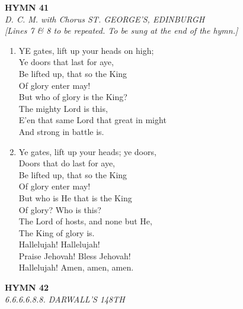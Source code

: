 \newpage
\begin{center}
    {\Large \textbf{HYMN 41}}
    \\
    \textit{D. C. M. with Chorus ST. GEORGE'S, EDINBURGH}
    \\
    \textit{\small [Lines 7 & 8 to be repeated. To be sung at the end of the hymn.]}
\end{center}
\vspace{1em}

\begin{enumerate}
    \item YE gates, lift up your heads on high; \\
        Ye doors that last for aye, \\
        Be lifted up, that so the King \\
        Of glory enter may! \\
        But who of glory is the King? \\
        The mighty Lord is this, \\
        E'en that same Lord that great in might \\
        And strong in battle is.

    \item Ye gates, lift up your heads; ye doors, \\
        Doors that do last for aye, \\
        Be lifted up, that so the King \\
        Of glory enter may! \\
        But who is He that is the King \\
        Of glory? Who is this? \\
        The Lord of hosts, and none but He, \\
        The King of glory is. \\
        Hallelujah! Hallelujah! \\
        Praise Jehovah! Bless Jehovah! \\
        Hallelujah! Amen, amen, amen.

\end{enumerate}

\newpage
\begin{center}
    {\Large \textbf{HYMN 42}}
    \\
    \textit{6.6.6.6.8.8. DARWALL'S 148TH}
\end{center}
\vspace{1em}

